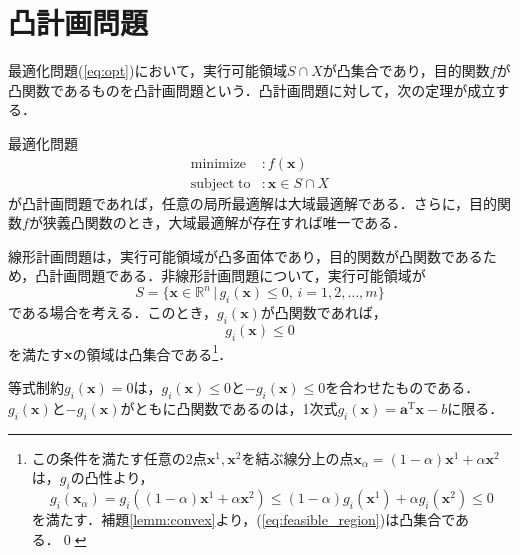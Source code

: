 \documentclass{jsreport}
\begin{document}
\section{凸計画問題}\label{sec:convex_prob}
最適化問題(\ref{eq:opt})において，実行可能領域$S \cap X$が凸集合であり，目的関数$f$が凸関数であるものを凸計画問題という．凸計画問題に対して，次の定理が成立する．
\begin{theo}\label{theo:convex_problem}
  最適化問題
  \begin{align}
    \mathrm{minimize} &: f(\bm{x}) \nonumber\\
    \mathrm{subject \; to} &: \bm{x} \in S \cap X \nonumber
  \end{align}
  が凸計画問題であれば，任意の局所最適解は大域最適解である．さらに，目的関数$f$が狭義凸関数のとき，大域最適解が存在すれば唯一である．
\end{theo}

線形計画問題は，実行可能領域が凸多面体であり，目的関数が凸関数であるため，凸計画問題である．非線形計画問題について，実行可能領域が
\begin{equation}\label{eq:feasible_region}
  S = \{\bm{x} \in \mathbb{R}^n \, | \, g_i(\bm{x}) \leq 0, \, i = 1, 2, \ldots, m\}
\end{equation}
である場合を考える．このとき，$g_i(\bm{x})$が凸関数であれば，
\begin{equation}
  g_i(\bm{x}) \leq 0 \nonumber
\end{equation}
を満たす$\bm{x}$の領域は凸集合である\footnote{この条件を満たす任意の2点$\bm{x}^1, \bm{x}^2$を結ぶ線分上の点$\bm{x}_{\alpha} = (1 - \alpha)\bm{x}^1 + \alpha \bm{x}^2$
は，$g_i$の凸性より，
\begin{equation}
  g_i(\bm{x}_{\alpha}) = g_i((1 - \alpha)\bm{x}^1 + \alpha \bm{x}^2) \leq (1 - \alpha)g_i(\bm{x}^1) + \alpha g_i(\bm{x}^2) \leq 0 \nonumber
\end{equation}
を満たす．補題\ref{lemm:convex}より，(\ref{eq:feasible_region})は凸集合である．\qed
}．

等式制約$g_i(\bm{x}) = 0$は，$g_i(\bm{x}) \leq 0$と$-g_i(\bm{x}) \leq 0$を合わせたものである．$g_i(\bm{x})$と$-g_i(\bm{x})$がともに凸関数であるのは，1次式$g_i(\bm{x}) = \bm{a}^{\mathrm{T}}\bm{x} - b$に限る．
\end{document}

